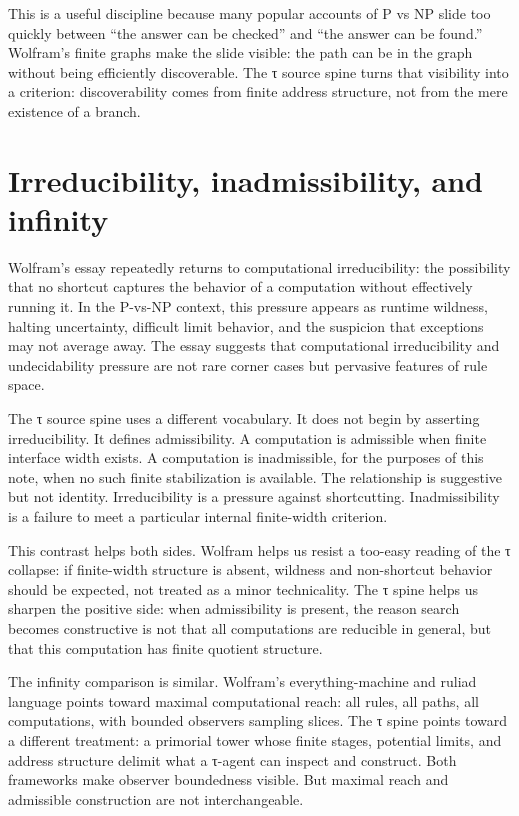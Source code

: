 \documentclass{pantarhei-researchnote}
\begin{document}
This is a useful discipline because many popular accounts of P vs NP
slide too quickly between ``the answer can be checked'' and ``the answer
can be found.'' Wolfram's finite graphs make the slide visible: the path
can be in the graph without being efficiently discoverable. The τ source
spine turns that visibility into a criterion: discoverability comes from
finite address structure, not from the mere existence of a branch.

\section{Irreducibility, inadmissibility, and infinity}
\label{sec:irreducibility}

Wolfram's essay repeatedly returns to computational irreducibility: the
possibility that no shortcut captures the behavior of a computation
without effectively running it. In the P-vs-NP context, this pressure
appears as runtime wildness, halting uncertainty, difficult limit behavior,
and the suspicion that exceptions may not average away. The essay suggests
that computational irreducibility and undecidability pressure are not rare
corner cases but pervasive features of rule space.

The τ source spine uses a different vocabulary. It does not begin by
asserting irreducibility. It defines admissibility. A computation is
admissible when finite interface width exists. A computation is
inadmissible, for the purposes of this note, when no such finite
stabilization is available. The relationship is suggestive but not
identity. Irreducibility is a pressure against shortcutting. Inadmissibility
is a failure to meet a particular internal finite-width criterion.

This contrast helps both sides. Wolfram helps us resist a too-easy
reading of the τ collapse: if finite-width structure is absent, wildness
and non-shortcut behavior should be expected, not treated as a minor
technicality. The τ spine helps us sharpen the positive side: when
admissibility is present, the reason search becomes constructive is not
that all computations are reducible in general, but that this computation
has finite quotient structure.

The infinity comparison is similar. Wolfram's everything-machine and
ruliad language points toward maximal computational reach: all rules, all
paths, all computations, with bounded observers sampling slices. The τ
spine points toward a different treatment: a primorial tower whose finite
stages, potential limits, and address structure delimit what a τ-agent can
inspect and construct. Both frameworks make observer boundedness visible.
But maximal reach and admissible construction are not interchangeable.
\end{document}
